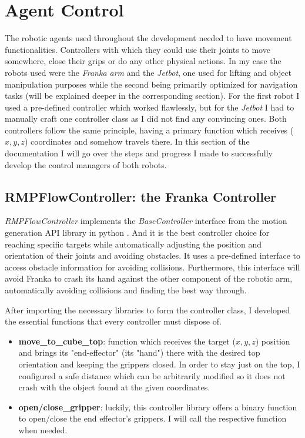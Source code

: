 \section{Agent Control}
\label{sec:controllers}
The robotic agents used throughout the development needed to have movement functionalities. Controllers with which they could use their joints to move somewhere, close their grips or do any other physical actions. In my case the robots used were the \textit{Franka arm} and the \textit{Jetbot}, one used for lifting and object manipulation purposes while the second being primarily optimized for navigation tasks (will be explained deeper in the corresponding section). For the first robot I used a pre-defined controller which worked flawlessly, but for the \textit{Jetbot} I had to manually craft one controller class as I did not find any convincing ones. Both controllers follow the same principle, having a primary function which receives ($x, y, z$) coordinates and somehow travels there. In this section of the documentation I will go over the steps and progress I made to successfully develop the control managers of both robots. 

\subsection{RMPFlowController: the Franka Controller}
\label{sec:franka_controller}
\textit{RMPFlowController} implements the \textit{BaseController} interface from the motion generation API library in python \cite{IsaacSimRMPFlow2024}. And it is the best controller choice for reaching specific targets while automatically adjusting the position and orientation of their joints and avoiding obstacles. It uses a pre-defined interface to access obstacle information for avoiding collisions. Furthermore, this interface will avoid Franka to crash its hand against the other component of the robotic arm, automatically avoiding collisions and finding the best way through. 

After importing the necessary libraries to form the controller class, I developed the essential functions that every controller must dispose of.

\begin{itemize}
	\item \textbf{move\_to\_cube\_top}: function which receives the target ($x,y,z$) position and brings its "end-effector" (its "hand") there with the desired top orientation and keeping the grippers closed. In order to stay just on the top, I configured a safe distance which can be arbitrarily modified so it does not crash with the object found at the given coordinates. 
	
	\item \textbf{open/close\_gripper}: luckily, this controller library offers a binary function to open/close the end effector's grippers. I will call the respective function when needed. 
\end{itemize}


